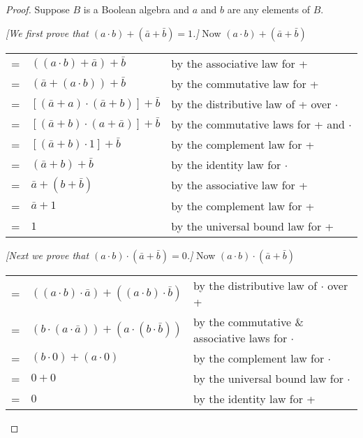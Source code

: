 \documentclass[14pt]{extarticle}
\newcommand{\cy}{\color{cyan}}
\begin{document}
\begin{proof}
  Suppose $B$ is a Boolean algebra and $a$ and $b$ are any elements of $B$.

    {\it [We first prove that \((a \cdot b) + (\bar{a} + \bar{b}) = 1\).]} Now \((a \cdot b) + (\bar{a} + \bar{b})\)

  \begin{center}
    \begin{tabular}{cll}
      = & \(((a \cdot b) + \bar{a}) + \bar{b}\)             & {\cy by the associative law for +}              \\
      = & \((\bar{a} + (a \cdot b)) + \bar{b}\)             & {\cy by the commutative law for +}              \\
      = & \([(\bar{a} + a) \cdot (\bar{a} + b)] + \bar{b}\) & {\cy by the distributive law of + over $\cdot$} \\
      = & \([(\bar{a} + b) \cdot (a + \bar{a})] + \bar{b}\) & {\cy by the commutative laws for + and $\cdot$} \\
      = & \([(\bar{a} + b) \cdot 1] + \bar{b}\)             & {\cy by the complement law for +}               \\
      = & \((\bar{a} + b) + \bar{b}\)                       & {\cy by the identity law for $\cdot$}           \\
      = & \(\bar{a} + (b + \bar{b})\)                       & {\cy by the associative law for +}              \\
      = & \(\bar{a} + 1\)                                   & {\cy by the complement law for +}               \\
      = & \(1\)                                             & {\cy by the universal bound law for +}
    \end{tabular}
  \end{center}

  {\it [Next we prove that \((a \cdot b) \cdot (\bar{a} + \bar{b}) = 0\).]} Now \((a \cdot b) \cdot (\bar{a} + \bar{b})\)

  \begin{center}
    \begin{tabular}{cll}
      = & \(((a \cdot b) \cdot \bar{a}) + ((a \cdot b) \cdot \bar{b})\) & {\cy by the distributive law of $\cdot$ over +}          \\
      = & \((b \cdot (a \cdot \bar{a})) + (a \cdot (b \cdot \bar{b}))\) & {\cy by the commutative \& associative laws for $\cdot$} \\
      = & \((b \cdot 0) + (a \cdot 0)\)                                 & {\cy by the complement law for $\cdot$}                  \\
      = & \(0 + 0\)                                                     & {\cy by the universal bound law for $\cdot$}             \\
      = & \(0\)                                                         & {\cy by the identity law for +}
    \end{tabular}
  \end{center}


\end{proof}
\end{document}
